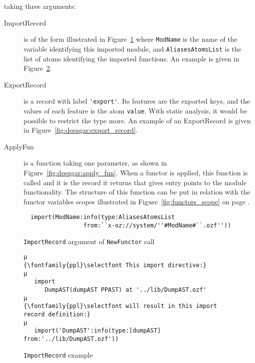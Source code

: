 \documentclass[a4paper]{memoir}
\begin{document}
taking three arguments:
\begin{description}
  \item[ImportRecord] is of the form  illustrated in
    Figure~\ref{fig:desugar:import_record}
    where \lstinline!ModName! is the name
    of the variable identifying this imported module, and
    \lstinline!AliasesAtomsList! is the list of atoms identifying the imported
    functions. An example is given in Figure~\ref{fig:desugar:import_record_example}.
  \item[ExportRecord] is a record with label \lstinline!'export'!. Its features are the
    exported keys, and the values of each feature is the atom \lstinline!value!.
     With static analysis, it would be possible to restrict the
    type more. An example of an ExportRecord is given in Figure~\ref{fig:desugar:export_record}.
  \item[ApplyFun] is a function taking one parameter, as shown in
    Figure~\ref{fig:desugar:apply_fun}. When a functor is applied, this function is called
    and it is the record it returns that gives entry points to the module
    functionality. The structure of this function can be put in relation with
    the functor variables scopes illustrated in Figure~\ref{fig:functors_scope}
    on page \pageref{fig:functors_scope}.
\end{description}

\begin{figure}[ht]
\begin{lstlisting}
  import(ModName:info(type:AliasesAtomsList 
                 from:``x-oz://system/''#ModName#``.ozf'')) 
\end{lstlisting}
\caption{\lstinline!ImportRecord! argument of \lstinline!NewFunctor! call}
\label{fig:desugar:import_record}
\end{figure}


\begin{figure}[ht]
\begin{lstlisting}
µ
{\fontfamily{ppl}\selectfont This import directive:}
µ
   import
      DumpAST(dumpAST PPAST) at '../lib/DumpAST.ozf'
µ
{\fontfamily{ppl}\selectfont will result in this import record definition:}
µ
   import('DumpAST':info(type:[dumpAST] from:'../lib/DumpAST.ozf'))
\end{lstlisting}
\caption{\lstinline!ImportRecord! example}
\label{fig:desugar:import_record_example}
\end{figure}
\end{document}
